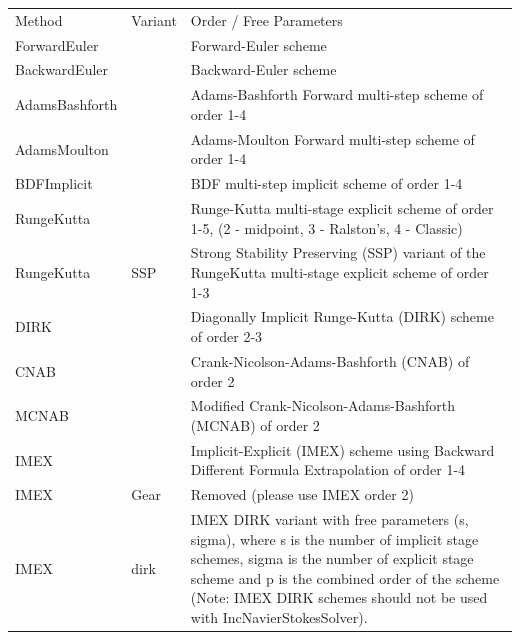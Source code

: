 \begin{center}
\scriptsize
\begin{tabular}{p{2.5cm}p{4cm}p{8cm}}
\toprule
Method         & Variant & Order / Free Parameters \\
ForwardEuler   &      & Forward-Euler scheme\\
BackwardEuler  &      & Backward-Euler scheme\\

AdamsBashforth &      & Adams-Bashforth Forward multi-step scheme of order 1-4\\

AdamsMoulton   &      & Adams-Moulton Forward multi-step scheme of order 1-4\\

BDFImplicit    &      & BDF multi-step implicit scheme of order 1-4\\

RungeKutta     &      & Runge-Kutta multi-stage explicit scheme of
                        order 1-5, (2 - midpoint, 3 - Ralston's, 4 - Classic)\\

RungeKutta     & SSP  & Strong Stability Preserving (SSP) variant of
                        the RungeKutta multi-stage explicit scheme of
                        order 1-3\\

DIRK           &      & Diagonally Implicit Runge-Kutta (DIRK) scheme of
                        order 2-3\\

CNAB           &      & Crank-Nicolson-Adams-Bashforth (CNAB) of order 2\\

MCNAB          &      & Modified Crank-Nicolson-Adams-Bashforth (MCNAB)
                        of order 2\\

IMEX           &      & Implicit-Explicit (IMEX) scheme using Backward
                        Different Formula Extrapolation of order 1-4\\

IMEX           & Gear & Removed (please use IMEX order 2) \\

IMEX           & dirk & IMEX DIRK variant with free parameters (s, sigma), 
                        where s is the number of implicit stage schemes,
                        sigma is the number of explicit stage scheme and
                        p is the combined order of the scheme (Note: IMEX 
                        DIRK schemes should not be used with IncNavierStokesSolver).\\


\end{tabular}
\end{center}
